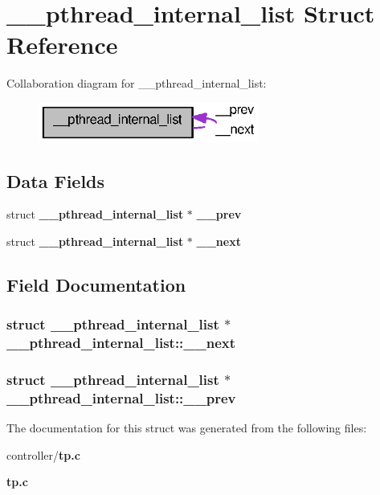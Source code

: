 \section{\_\-\_\-pthread\_\-internal\_\-list Struct Reference}
\label{struct____pthread__internal__list}


Collaboration diagram for \_\-\_\-pthread\_\-internal\_\-list:
\nopagebreak
\begin{figure}[H]
\begin{center}
\leavevmode
\includegraphics[width=205pt]{struct____pthread__internal__list__coll__graph}
\end{center}
\end{figure}
\subsection*{Data Fields}
\begin{DoxyCompactItemize}
\item 
struct {\bf \_\-\_\-pthread\_\-internal\_\-list} $\ast$ {\bf \_\-\_\-prev}
\item 
struct {\bf \_\-\_\-pthread\_\-internal\_\-list} $\ast$ {\bf \_\-\_\-next}
\end{DoxyCompactItemize}


\subsection{Field Documentation}
\subsubsection[{\_\-\_\-next}]{\setlength{\rightskip}{0pt plus 5cm}struct {\bf \_\-\_\-pthread\_\-internal\_\-list} $\ast$ {\bf \_\-\_\-pthread\_\-internal\_\-list::\_\-\_\-next}}\label{struct____pthread__internal__list_af435e8fbe0dd4cfa2d3eee2465e29dad}
\subsubsection[{\_\-\_\-prev}]{\setlength{\rightskip}{0pt plus 5cm}struct {\bf \_\-\_\-pthread\_\-internal\_\-list} $\ast$ {\bf \_\-\_\-pthread\_\-internal\_\-list::\_\-\_\-prev}}\label{struct____pthread__internal__list_a2e90cc97076b0ecaa46cca1dd6af5220}


The documentation for this struct was generated from the following files:\begin{DoxyCompactItemize}
\item 
controller/{\bf tp.c}\item 
{\bf tp.c}\end{DoxyCompactItemize}
